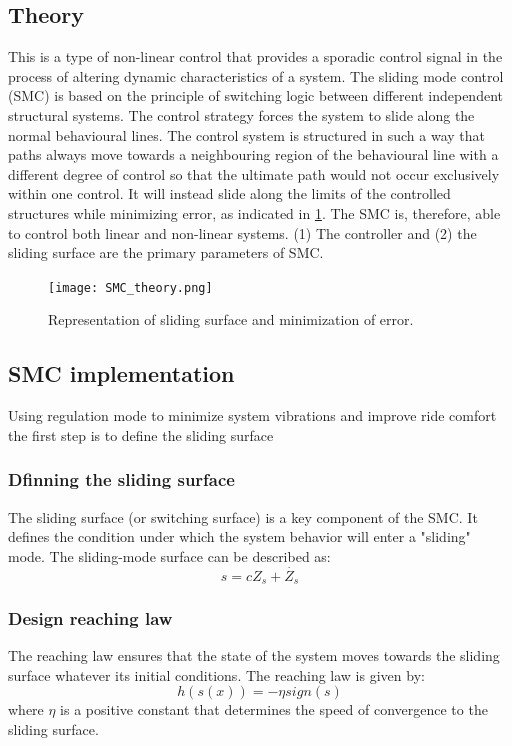 \subsection{Theory}
This is a type of non-linear control that provides a sporadic control signal in the process of altering dynamic characteristics of a system. The sliding mode control (SMC) is based on the principle of switching logic between different independent structural systems. The control strategy forces the system to slide along the normal behavioural lines. The control system is structured in such a way that paths always move towards a neighbouring region of the behavioural line with a different degree of control so that the ultimate path would not occur exclusively within one control. It will instead slide along the limits of the controlled structures while minimizing error, as indicated in \ref{fig:smc}. The SMC is, therefore, able to control both linear and non-linear systems. (1) The controller and (2) the sliding surface are the primary parameters of SMC.
\begin{figure}[H]
	\centering
	\texttt{[image: SMC\_theory.png]}
	\caption{Representation of sliding surface and minimization of error. \cite{WANI2022103}
	} \label{fig:smc}
\end{figure}
\subsection{SMC implementation}
Using regulation mode to minimize system vibrations and improve ride comfort the first step is to define the sliding surface 
\subsubsection{Dfinning the sliding surface}
The sliding surface (or switching surface) is a key component of the SMC. It defines the condition under which the system behavior will enter a "sliding" mode. The sliding-mode surface can be described as:
\begin{equation}
	s = cZ_s+\dot{Z_s}
\end{equation}

\subsubsection{Design reaching law}
The reaching law ensures that the state of the system moves towards the sliding surface whatever its initial conditions. The reaching law is given by:
\begin{equation}
	h\left(s\left(x\right)\right) = -\eta sign\left(s\right)
\end{equation}
where $\eta$ is a positive constant that determines the speed of convergence to the sliding surface.

